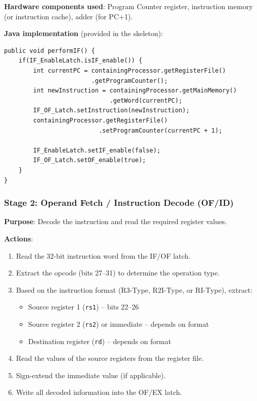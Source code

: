 \documentclass[12pt,a4paper]{article}
\begin{document}
\textbf{Hardware components used}: Program Counter register, instruction memory (or instruction cache), adder (for PC+1).

\textbf{Java implementation} (provided in the skeleton):
\begin{lstlisting}[style=javastyle, caption={InstructionFetch.java -- performIF()}]
public void performIF() {
    if(IF_EnableLatch.isIF_enable()) {
        int currentPC = containingProcessor.getRegisterFile()
                        .getProgramCounter();
        int newInstruction = containingProcessor.getMainMemory()
                             .getWord(currentPC);
        IF_OF_Latch.setInstruction(newInstruction);
        containingProcessor.getRegisterFile()
                          .setProgramCounter(currentPC + 1);

        IF_EnableLatch.setIF_enable(false);
        IF_OF_Latch.setOF_enable(true);
    }
}
\end{lstlisting}

\subsubsection{Stage 2: Operand Fetch / Instruction Decode (OF/ID)}

\textbf{Purpose}: Decode the instruction and read the required register values.

\textbf{Actions}:
\begin{enumerate}
    \item Read the 32-bit instruction word from the IF/OF latch.
    \item Extract the opcode (bits 27--31) to determine the operation type.
    \item Based on the instruction format (R3-Type, R2I-Type, or RI-Type), extract:
    \begin{itemize}
        \item Source register 1 (\texttt{rs1}) -- bits 22--26
        \item Source register 2 (\texttt{rs2}) or immediate -- depends on format
        \item Destination register (\texttt{rd}) -- depends on format
    \end{itemize}
    \item Read the values of the source registers from the register file.
    \item Sign-extend the immediate value (if applicable).
    \item Write all decoded information into the OF/EX latch.
\end{enumerate}
\end{document}
